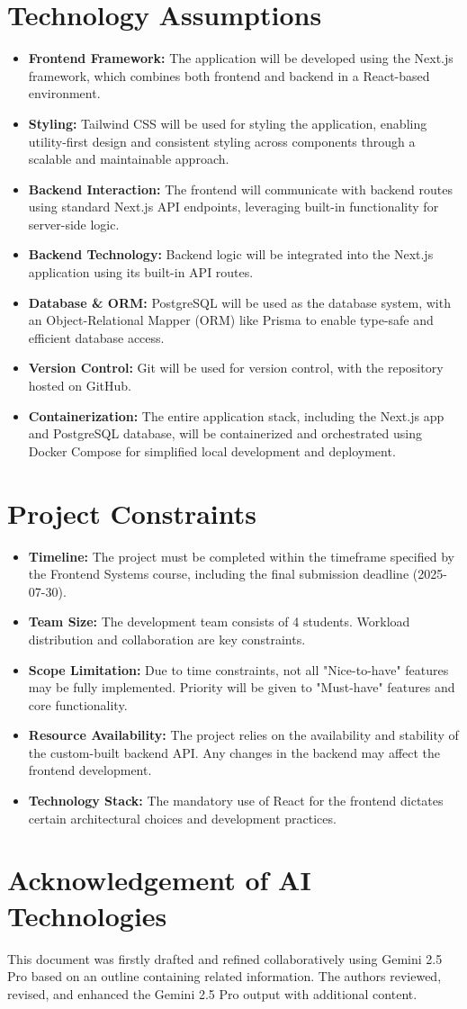 \documentclass[a4paper,11pt]{article}
\begin{document}
\section{Technology Assumptions}
\begin{itemize}
    \item \textbf{Frontend Framework:} The application will be developed using the Next.js framework, which combines both frontend and backend in a React-based environment.
    \item \textbf{Styling:} Tailwind CSS will be used for styling the application, enabling utility-first design and consistent styling across components through a scalable and maintainable approach.
    \item \textbf{Backend Interaction:} The frontend will communicate with backend routes using standard Next.js API endpoints, leveraging built-in functionality for server-side logic.
    \item \textbf{Backend Technology:} Backend logic will be integrated into the Next.js application using its built-in API routes.
    \item \textbf{Database \& ORM:} PostgreSQL will be used as the database system, with an Object-Relational Mapper (ORM) like Prisma to enable type-safe and efficient database access.
    \item \textbf{Version Control:} Git will be used for version control, with the repository hosted on GitHub.
    \item \textbf{Containerization:} The entire application stack, including the Next.js app and PostgreSQL database, will be containerized and orchestrated using Docker Compose for simplified local development and deployment.
\end{itemize}

\section{Project Constraints}
\begin{itemize}
    \item \textbf{Timeline:} The project must be completed within the timeframe specified by the Frontend Systems course, including the final submission deadline (2025-07-30).
    \item \textbf{Team Size:} The development team consists of 4 students. Workload distribution and collaboration are key constraints.
    \item \textbf{Scope Limitation:} Due to time constraints, not all "Nice-to-have" features may be fully implemented. Priority will be given to "Must-have" features and core functionality.
    \item \textbf{Resource Availability:} The project relies on the availability and stability of the custom-built backend API. Any changes in the backend may affect the frontend development.
    \item \textbf{Technology Stack:} The mandatory use of React for the frontend dictates certain architectural choices and development practices.
\end{itemize}

\section*{Acknowledgement of AI Technologies}
This document was firstly drafted and refined collaboratively using Gemini 2.5 Pro based on an outline containing related information. The authors reviewed, revised, and enhanced the Gemini 2.5 Pro
output with additional content. 
\end{document}
